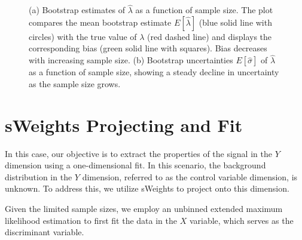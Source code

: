 \documentclass{article}
\begin{document}
\begin{figure}[!htbp]
    \centering
    \hspace{0.0\textwidth}
    \caption{(a) Bootstrap estimates of \(\hat{\lambda}\) as a function of sample size. The plot compares the mean bootstrap estimate \(E[\hat{\lambda}]\) (blue solid line with circles) with the true value of \(\lambda\) (red dashed line) and displays the corresponding bias (green solid line with squares). Bias decreases with increasing sample size. 
(b) Bootstrap uncertainties \(E[\hat{\sigma}]\) of \(\hat{\lambda}\) as a function of sample size, showing a steady decline in uncertainty as the sample size grows.}
    \label{fig:sample_sizes}
\end{figure}

\newpage
\section{sWeights Projecting and Fit}

In this case, our objective is to extract the properties of the signal in the $Y$ dimension using a one-dimensional fit. In this scenario, the background distribution in the $Y$ dimension, referred to as the control variable dimension, is unknown. To address this, we utilize sWeights to project onto this dimension.

Given the limited sample sizes, we employ an unbinned extended maximum likelihood estimation to first fit the data in the $X$ variable, which serves as the discriminant variable. 
\end{document}
